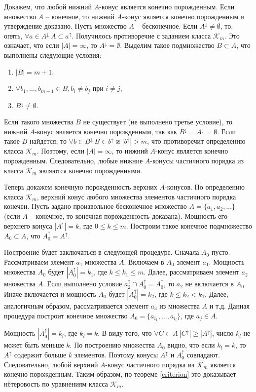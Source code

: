 \documentclass[12pt]{article}
\theoremstyle{break}
\def\K{\mathcal{K}_m}
\begin{document}
		Докажем, что любой нижний $A$-конус является конечно порожденным. Если множество $A$ -- конечное, то нижний $A$-конус является конечно порожденным и утверждение доказано. Пусть множество $A$ -- бесконечное. Если $A^{\downarrow} \neq \emptyset$, то, опять, $\forall a\in A^{\downarrow}~A\subset a^{\uparrow}$. Получилось противоречие с заданием класса $\K$. Это означает, что если $|A| = \infty$, то $A^{\downarrow} = \emptyset$. Выделим такое подмножество $B\subset A$, что выполнены следующие условия:
		\begin{enumerate}
			\item $|B| = m + 1$,
			\item $\forall b_1,\dots,b_{m+1}\in B, b_i\neq b_j$ при $i\neq j$,
			\item $B^{\downarrow} \neq \emptyset$.
		\end{enumerate}
		Если такого множества $B$ не существует (не выполнено третье условие), то нижний $A$-конус является конечно порожденным, так как $B^{\downarrow} = A^{\downarrow} = \emptyset$. Если такое $B$ найдется, то $\forall b\in B^{\downarrow}~B\in b^{\uparrow}$ и $|b^{\uparrow}| > m$, что противоречит определению класса $\K$. Поэтому, если $|A|=\infty$, то нижний $A$-конус является конечно порожденным. Следовательно, любые нижние $A$-конусы частичного порядка из класса $\K$ являются конечно порожденными.

		Теперь докажем конечную порожденность верхних $A$-конусов. По определению класса $\K$, верхний конус любого множества элементов частичного порядка конечен. Пусть задано произвольное бесконечное множество $A = \{a_1, a_2,\dots\}$ (если $A$ -- конечное, то конечная порожденность доказана). Мощность его верхнего конуса $|A^{\uparrow}| = k$, где $0\leqslant k\leqslant m$. Построим такое конечное подмножество $A_0\subset A$, что $A_0^{\uparrow} = A^{\uparrow}$.

		Построение будет заключаться в следующей процедуре. Сначала $A_0$ пусто. Рассматриваем элемент $a_1$ множества $A$. Включаем в $A_0$ элемент $a_1$. Мощность множества $A_0$ будет $|A_0^{\uparrow}| = k_1$, где $k\leqslant k_1\leqslant m$. Далее, рассматриваем элемент $a_2$ множества $A$. Если выполнено условие $a_2^{\uparrow} \cap A_0^{\uparrow} = A_0^{\uparrow}$, то $a_2$ не включается в $A_0$. Иначе включается и мощность $A_0$ будет $|A_0^{\uparrow}| = k_2$, где $k\leqslant k_2 < k_1$. Далее, аналогичным образом, рассматривается элемент $a_3$ из множества $A$ и т.д. Данная процедура построит конечное множество $A_0=\{a_{i_1},\dots, a_{i_l}\}$, где $a_j\in A$.

		Мощность $|A_0^{\uparrow}| = k_l$, где $k_l = k$. В виду того, что $\forall C\subset A~|C^{\uparrow}| \geqslant |A^{\uparrow}|$, число $k_l$ не может быть меньше $k$. По построению множества $A_0$ видно, что если $k_l = k$, то $A^{\uparrow}$ содержит больше $k$ элементов. Поэтому конусы $A^{\uparrow}$ и $A_0^{\uparrow}$ совпадают. Следовательно, любой верхний $A$-конус частичного порядка из $\K$ является конечно порожденным. Таким образом, по теореме \ref{criterion} это доказывает нётеровость по уравнениям класса $\K$.

		

	
\end{document}
